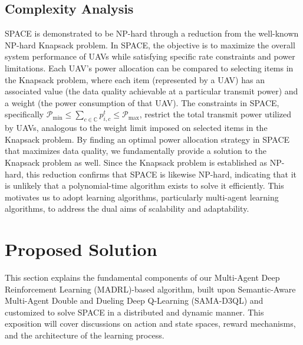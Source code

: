 \documentclass[conference]{IEEEtran}
\begin{document}
\subsection{Complexity Analysis}\label{ss_cmp_ana}
SPACE is demonstrated to be NP-hard through a reduction from the well-known NP-hard Knapsack problem. In SPACE, the objective is to maximize the overall system performance of UAVs while satisfying specific rate constraints and power limitations. Each UAV's power allocation can be compared to selecting items in the Knapsack problem, where each item (represented by a UAV) has an associated value (the data quality achievable at a particular transmit power) and a weight (the power consumption of that UAV). The constraints in SPACE, specifically \(\mathcal{P}_{\text{min}} \leq \sum_{c \in \mathbb{C}} p_{i, c}^{t} \leq \mathcal{P}_{\text{max}}\), restrict the total transmit power utilized by UAVs, analogous to the weight limit imposed on selected items in the Knapsack problem. By finding an optimal power allocation strategy in SPACE that maximizes data quality, we fundamentally provide a solution to the Knapsack problem as well. Since the Knapsack problem is established as NP-hard, this reduction confirms that SPACE is likewise NP-hard, indicating that it is unlikely that a polynomial-time algorithm exists to solve it efficiently. This motivates us to adopt learning algorithms, particularly multi-agent learning algorithms, to address the dual aims of scalability and adaptability.



\section{Proposed Solution}\label{s_prp_slt}
This section explains the fundamental components of our Multi-Agent Deep Reinforcement Learning (MADRL)-based algorithm, built upon Semantic-Aware Multi-Agent Double and Dueling Deep Q-Learning (SAMA-D3QL) \cite{mazandarani2024semantic} and customized to solve SPACE in a distributed and dynamic manner. This exposition will cover discussions on action and state spaces, reward mechanisms, and the architecture of the learning process.
\end{document}
